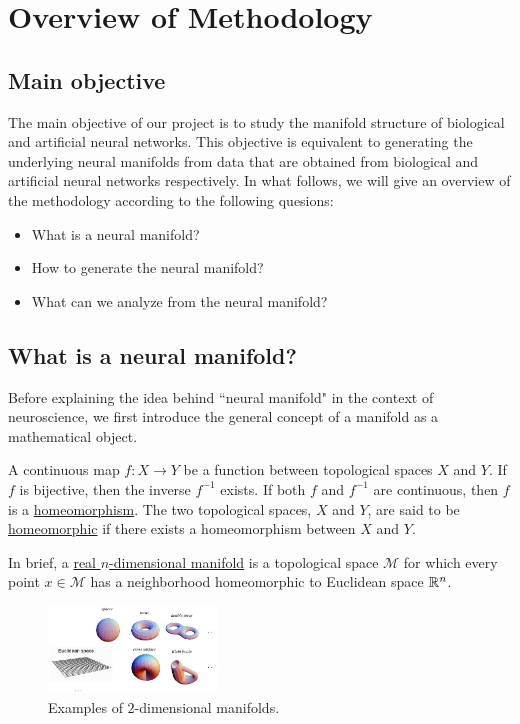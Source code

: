 \chapter{Overview of Methodology} 
\label{chapter-outline}

\section{Main objective}

The main objective of our project is to study the manifold structure of biological and artificial neural networks. This objective is equivalent to generating the underlying neural manifolds from data that are obtained from biological and artificial neural networks respectively. In what follows, we will give an overview of the methodology according to the following quesions:
\begin{itemize}
    \item What is a neural manifold?
    \item How to generate the neural manifold?
    \item What can we analyze from the neural manifold?
\end{itemize}


\section{What is a neural manifold?}
Before explaining the idea behind ``neural manifold" in the context of neuroscience, we first introduce the general concept of a manifold as a mathematical object.

\begin{defn}[Homeomorphism]
A continuous map $f: X \to Y$ be a function between topological spaces $X$ and $Y$. If $f$ is bijective, then the inverse $f^{-1}$ exists. If both $f$ and $f^{-1}$ are continuous, then $f$ is a \underline{homeomorphism}. The two topological spaces, $X$ and $Y$, are said to be \underline{homeomorphic} if there exists a homeomorphism between $X$ and $Y$. 
\end{defn}
    \begin{defn}[Manifold]
   In brief, a \underline{real $n$-dimensional manifold} is a topological space $\mathcal{M}$ for which every point $x\in\mathcal{M}$ has a neighborhood homeomorphic to Euclidean space $\mathbb R^n$.
    \end{defn}
   \begin{figure}[H]
      \centering
     \includegraphics[width=0.4\textwidth]{presentation/manifold.jpg}
     \caption{Examples of $2$-dimensional manifolds.}
    \end{figure} 
            
